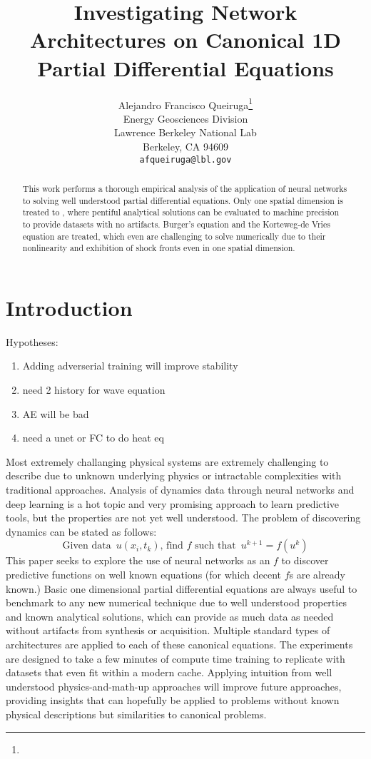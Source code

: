 \documentclass{article}
\title{Investigating Network Architectures on Canonical 1D Partial Differential Equations}
\author{%
  Alejandro Francisco Queiruga\thanks{} \\
  Energy Geosciences Division\\
  Lawrence Berkeley National Lab\\
  Berkeley, CA 94609\\
  \texttt{afqueiruga@lbl.gov} \\
}
\begin{document}
\maketitle

\begin{abstract}
  This work performs a thorough empirical analysis of the application
  of neural networks to solving well understood partial differential
  equations. Only one spatial dimension is treated to , where pentiful analytical solutions can be evaluated to machine precision to provide datasets with no artifacts.
  Burger's equation and the Korteweg-de Vries equation are treated,
  which even are challenging to solve numerically due
  to their nonlinearity and exhibition of shock fronts even in one spatial dimension.
\end{abstract}

\section{Introduction}

Hypotheses:
\begin{enumerate}
  \item Adding adverserial training will improve stability
  \item need 2 history for wave equation
  \item AE will be bad
    \item need a unet or FC to do heat eq
\end{enumerate}

Most extremely challanging physical systems are extremely challenging to describe due to unknown underlying physics or intractable complexities with traditional approaches. Analysis of dynamics data through neural networks and deep learning is a hot topic and very promising approach to learn predictive tools, but the properties are not yet well understood. The problem of discovering dynamics can be stated as follows:
\begin{equation}
\textrm{Given data }\, u(x_i,t_k), \,\textrm{find }f\textrm{ such that }\, u^{k+1}=f(u^k)
\end{equation}
This paper seeks to explore the use of neural networks as an $f$ to discover predictive functions on well known equations (for which decent $f$s are already known.)
Basic one dimensional partial differential equations are always useful to benchmark to any new numerical technique due to well understood properties and known analytical solutions, which can provide as much data as needed without artifacts from synthesis or acquisition.
Multiple standard types of architectures are applied to each of these
canonical equations.
The experiments are designed to take a few minutes of compute time training to replicate with datasets that even fit within a modern cache.
Applying intuition from well understood physics-and-math-up approaches will improve future approaches, providing insights that can hopefully be applied to problems without known physical descriptions but similarities to canonical problems.
\end{document}
